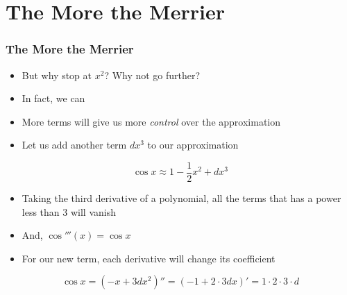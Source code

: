 \documentclass{beamer}
\begin{document}

\section{The More the Merrier}

\begin{frame}
  \frametitle{The More the Merrier}
  \begin{itemize}
    \item But why stop at \( x^2 \)? Why not go further?
    \item In fact, we can
    \item More terms will give us more \textit{control} over the approximation
    \item Let us add another term \( dx^3 \) to our approximation
  \end{itemize}
  \begin{equation*}
    \cos x \approx 1 - \frac{1}{2}x^2 + dx^3
  \end{equation*}
  \begin{itemize}
    \item Taking the third derivative of a polynomial, all the terms that has a power less than 3 will vanish
    \item And, \( \cos'''(x) = \cos x \)
    \item For our new term, each derivative will change its coefficient
  \end{itemize}
  \begin{equation*}
    \cos x = (-x + 3dx^2)'' = (-1 + 2 \cdot 3dx)' = 1 \cdot 2 \cdot 3 \cdot d
  \end{equation*}
\end{frame}
\end{document}
